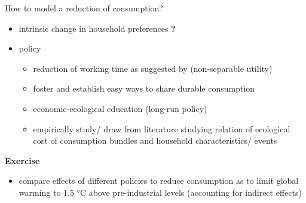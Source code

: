 \documentclass[11pt,aspectratio=169]{beamer}
\begin{document}
\begin{frame}{How to model a reduction of consumption?}
	\begin{itemize}[<+-| alert@+>]
		\item intrinsic change in household preferences \textbf{?}
		\item policy 
		\begin{itemize}
				\item reduction of working time as suggested by \cite{GoughCANGREEN} (non-separable utility)
				\item foster and establish easy ways to share durable consumption
				\item economic-ecological education (long-run policy)
	\item empirically study/ draw from literature studying relation of ecological cost of consumption bundles and household characteristics/ events 
		
	\end{itemize}
	\end{itemize}
\pause
\textbf{Exercise}
\begin{itemize}
\item compare effects of different policies to reduce consumption as to limit global warming to 1.5 °C above pre-industrial levels (accounting for indirect effects)
\end{itemize}
\end{frame}
\end{document}
